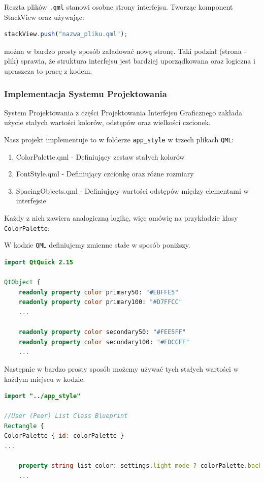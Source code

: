 Reszta plików \texttt{.qml} stanowi osobne strony interfejsu. 
Tworząc komponent StackView oraz używając:
\begin{lstlisting}[language=QML, caption={Ładowanie nowej strony}]
stackView.push("nazwa_pliku.qml");
\end{lstlisting}
można w bardzo prosty sposób załadować nową stronę.
Taki podział (strona - plik) sprawia, że struktura interfejsu jest bardziej
uporządkowana oraz logiczna i upraszcza to pracę z kodem.

\subsubsection{Implementacja Systemu Projektowania}
\label{sec:ImplementacjaSystemuProjektowania}
System Projektowania z części Projektowania Interfejsu Graficznego zakłada użycie stałych wartości kolorów, odstępów oraz wielkości czcionek.

Nasz projekt implementuje to w folderze \texttt{app\_style} w trzech plikach \texttt{QML}:

\begin{enumerate}
    \item ColorPalette.qml - Definiujący zestaw stałych kolorów
    \item FontStyle.qml - Definiujący czcionkę oraz różne rozmiary
    \item SpacingObjects.qml - Definiujący wartości odstępów między elementami w interfejsie
\end{enumerate}

Każdy z nich zawiera analogiczną logikę, więc omówię na przykładzie klasy \texttt{ColorPalette}:

W kodzie \texttt{QML} definiujemy zmienne stałe w sposób poniższy.

\begin{lstlisting}[language=QML, caption={ColorPalette.qml}]
import QtQuick 2.15

QtObject {
    readonly property color primary50: "#EBFFE5"
    readonly property color primary100: "#D7FFCC"
    ...

    readonly property color secondary50: "#FEE5FF"
    readonly property color secondary100: "#FDCCFF"
    ...
\end{lstlisting}

Następnie w bardzo prosty sposób możemy używać tych stałych wartości w każdym miejscu w kodzie:
\begin{lstlisting}[language=QML, caption={Przykładowe użycie palety kolorów}]
import "../app_style"

//User (Peer) List Class Blueprint
Rectangle {
ColorPalette { id: colorPalette }
...

    property string list_color: settings.light_mode ? colorPalette.background50 : colorPalette.background800
    ...
\end{lstlisting}  

